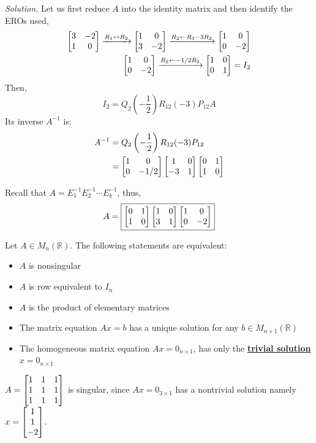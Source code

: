 \textit{Solution.} Let us first reduce $A$ into the identity matrix and then identify the EROs used,
\begin{align*}
\begin{bmatrix} 3 & -2 \\ 1 & 0 \end{bmatrix} \xrightarrow{R_1 \leftrightarrow R_2}
\begin{bmatrix} 1 & 0 \\ 3 & -2 \end{bmatrix} \xrightarrow{R_2 \leftarrow R_3 - 3R_2}
\begin{bmatrix} 1 & 0 \\ 0 & -2 \end{bmatrix} \\
\begin{bmatrix} 1 & 0 \\ 0 & -2 \end{bmatrix} \xrightarrow{R_2 \leftarrow -1/2R_2} \begin{bmatrix} 1 & 0 \\ 0 & 1 \end{bmatrix} = I_2
\end{align*}
Then,
$$I_2 = Q_2\left(-\frac{1}{2}\right)R_{12}(-3)P_{12}A$$
Its inverse $A^{-1}$ is:
\begin{align*}
A^{-1} &= Q_2\left(-\frac{1}{2}\right)R_{12}(-3)P_{12} \\
&=\begin{bmatrix} 1 & 0 \\ 0 & -1/2 \end{bmatrix}\begin{bmatrix} 1 & 0 \\ -3 & 1 \end{bmatrix}\begin{bmatrix} 0 & 1 \\ 1 & 0 \end{bmatrix}
\end{align*}

Recall that $A = E_1^{-1}E_2^{-1}\cdots E_k^{-1}$, thus,
$$A = \boxed{\begin{bmatrix} 0 & 1 \\ 1 & 0 \end{bmatrix}\begin{bmatrix} 1 & 0 \\ 3 & 1 \end{bmatrix}\begin{bmatrix} 1 & 0 \\ 0 & -2 \end{bmatrix}}$$

\begin{theorem}
Let $A \in M_n(\mathbb{R})$. The following statements are equivalent:
\begin{itemize}
    \item $A$ is nonsingular
    \item $A$ is row equivalent to $I_n$
    \item $A$ is the product of elementary matrices
    \item The matrix equation $Ax = b$ has a unique solution for any $b \in M_{n \times 1}(\mathbb{R})$
    \item The homogeneous matrix equation $Ax = 0_{n \times 1}$, has only the \underline{\textbf{trivial solution}} $x = 0_{n \times 1}$
\end{itemize}
\end{theorem}

\begin{example}
$A = \begin{bmatrix} 1 & 1 & 1 \\ 1 & 1 & 1 \\ 1 & 1 & 1 \end{bmatrix}$ is singular, since $Ax = 0_{3 \times 1}$ has a nontrivial solution namely $x = \begin{bmatrix} 1 \\ 1 \\ -2 \end{bmatrix}$.
\end{example}